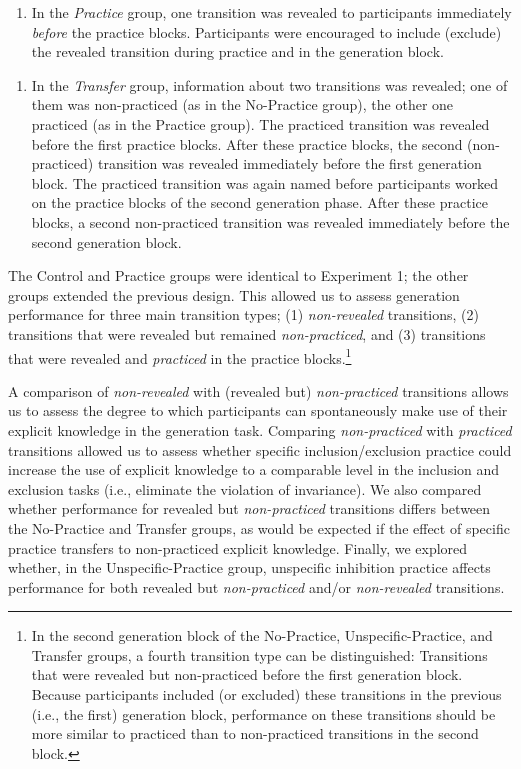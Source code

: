 \documentclass[floatsintext,man]{apa6}
\providecommand{\tightlist}{%
  \setlength{\itemsep}{0pt}\setlength{\parskip}{0pt}}
\begin{document}
\begin{enumerate}
\def\labelenumi{\arabic{enumi}.}
\setcounter{enumi}{3}
\tightlist
\item
  In the \emph{Practice} group, one transition was revealed to
  participants immediately \emph{before} the practice blocks.
  Participants were encouraged to include (exclude) the revealed
  transition during practice and in the generation block.
\end{enumerate}

\begin{enumerate}
\def\labelenumi{\arabic{enumi}.}
\setcounter{enumi}{4}
\tightlist
\item
  In the \emph{Transfer} group, information about two transitions was
  revealed; one of them was non-practiced (as in the No-Practice group),
  the other one practiced (as in the Practice group). The practiced
  transition was revealed before the first practice blocks. After these
  practice blocks, the second (non-practiced) transition was revealed
  immediately before the first generation block. The practiced
  transition was again named before participants worked on the practice
  blocks of the second generation phase. After these practice blocks, a
  second non-practiced transition was revealed immediately before the
  second generation block.
\end{enumerate}

The Control and Practice groups were identical to Experiment 1; the
other groups extended the previous design. This allowed us to assess
generation performance for three main transition types; (1)
\emph{non-revealed} transitions, (2) transitions that were revealed but
remained \emph{non-practiced}, and (3) transitions that were revealed
and \emph{practiced} in the practice blocks.\footnote{In the second
  generation block of the No-Practice, Unspecific-Practice, and Transfer
  groups, a fourth transition type can be distinguished: Transitions
  that were revealed but non-practiced before the first generation
  block. Because participants included (or excluded) these transitions
  in the previous (i.e., the first) generation block, performance on
  these transitions should be more similar to practiced than to
  non-practiced transitions in the second block.}

A comparison of \emph{non-revealed} with (revealed but)
\emph{non-practiced} transitions allows us to assess the degree to which
participants can spontaneously make use of their explicit knowledge in
the generation task. Comparing \emph{non-practiced} with
\emph{practiced} transitions allowed us to assess whether specific
inclusion/exclusion practice could increase the use of explicit
knowledge to a comparable level in the inclusion and exclusion tasks
(i.e., eliminate the violation of invariance). We also compared whether
performance for revealed but \emph{non-practiced} transitions differs
between the No-Practice and Transfer groups, as would be expected if the
effect of specific practice transfers to non-practiced explicit
knowledge. Finally, we explored whether, in the Unspecific-Practice
group, unspecific inhibition practice affects performance for both
revealed but \emph{non-practiced} and/or \emph{non-revealed}
transitions.
\end{document}
